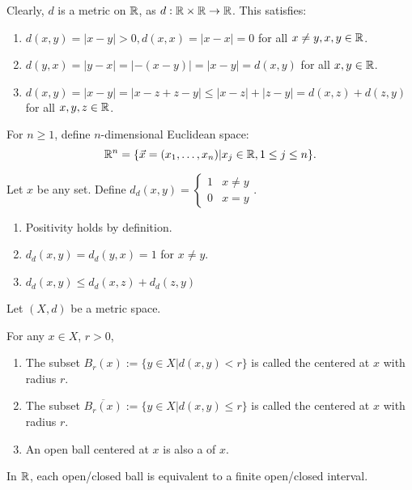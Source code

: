 \documentclass{book}
\begin{document}
Clearly, $d$ is a metric on $\mathbb{R}$, as $d : \mathbb{R} \times \mathbb{R} \to \mathbb{R}$. This satisfies:
\begin{enumerate}
    \item $d(x, y) = |x - y| > 0, d(x, x) = |x - x| = 0$ for all $x \neq y, x, y \in \mathbb{R}$.
    \item $d(y, x) = |y - x| = |-(x - y)| = |x - y| = d(x, y)$ for all $x, y \in \mathbb{R}$.
    \item $d(x, y) = |x - y| = |x - z + z - y| \leq |x - z| + |z - y| = d(x, z) + d(z, y)$ for all $x, y, z \in \mathbb{R}$.
\end{enumerate}

\begin{defn}
    For $n \geq 1$, define $n$-dimensional Euclidean space:
    \[\mathbb{R}^n = \{\vec x = (x_1, \ldots, x_n) | x_j \in \mathbb{R}, 1 \leq j \leq n \}.\] 
\end{defn}

\begin{ex}
    Let $x$ be any set. Define $d_d(x, y) = \begin{cases} 1 & x \neq y \\ 0 & x = y \end{cases}$.
\end{ex}
\begin{enumerate}
    \item Positivity holds by definition.
    \item $d_d (x, y) = d_d (y, x) = 1$ for $x \neq y$.
    \item $d_d (x, y) \leq d_d (x, z) + d_d (z, y)$
\end{enumerate}

\begin{defn}[balls]
    Let $(X, d)$ be a metric space.
    
    For any $x \in X$, $r > 0$,
    \begin{enumerate}
        \item The subset $B_r(x) := \{y \in X | d(x, y) < r\}$ is called the  centered at $x$ with radius $r$.
        \item The subset $\overline{B_r(x)} := \{y \in X | d(x, y) \leq r\}$ is called the  centered at $x$ with radius $r$.
        \item An open ball centered at $x$ is also a  of $x$.
    \end{enumerate}
\end{defn}

In $\mathbb{R}$, each open/closed ball is equivalent to a finite open/closed interval.
\end{document}
